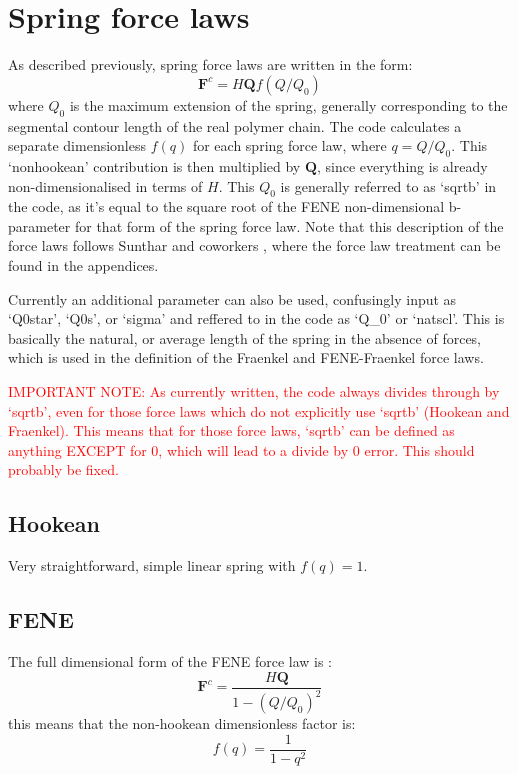 \documentclass{article}
\begin{document}
\section{Spring force laws}

As described previously, spring force laws are written in the form:
\begin{equation}
    \bm{F}^{c} = H \bm{Q} f(Q/Q_0)
\end{equation}
where $Q_0$ is the maximum extension of the spring, generally corresponding to the segmental contour length of the real polymer chain.
The code calculates a separate dimensionless $f(q)$ for each spring force law, where $q = Q/Q_0$.
This `nonhookean' contribution is then multiplied by $\bm{Q}$, since everything is already non-dimensionalised in terms of $H$.
This $Q_0$ is generally referred to as `sqrtb' in the code, as it's equal to the square root of the FENE non-dimensional b-parameter for that form of the spring force law.
Note that this description of the force laws follows Sunthar and coworkers \cite{sunthar2005parameter}, where the force law treatment can be found in the appendices.

Currently an additional parameter can also be used, confusingly input as `Q0star', `Q0s', or `sigma' and reffered to in the code as `Q\_0' or `natscl'.
This is basically the natural, or average length of the spring in the absence of forces, which is used in the definition of the Fraenkel and FENE-Fraenkel force laws.

\textcolor{red}{IMPORTANT NOTE: As currently written, the code always divides through by `sqrtb', even for those force laws which do not explicitly use `sqrtb' (Hookean and Fraenkel). This means that for those force laws, `sqrtb' can be defined as anything EXCEPT for 0, which will lead to a divide by 0 error. This should probably be fixed.} 

\subsection{Hookean}
Very straightforward, simple linear spring with $f(q) = 1$.

\subsection{FENE}
The full dimensional form of the FENE force law is \cite{Bird1987}:
\begin{equation}
    \bm{F}^{c} = \frac{H \bm{Q}}{1-(Q/Q_0)^2}
\end{equation}
this means that the non-hookean dimensionless factor is:
\begin{equation}
    f(q) = \frac{1}{1-q^2}
\end{equation}
\end{document}
